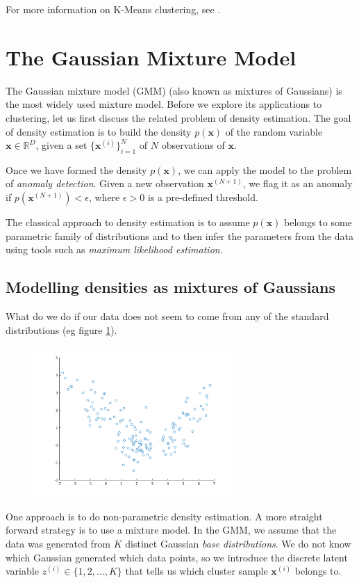 \documentclass[final,3p,times,twocolumn]{elsarticle}
\begin{document}
For more information on K-Means clustering, see \cite{Bishop}.

\section{The Gaussian Mixture Model}
The Gaussian mixture model (GMM) (also known as mixtures of Gaussians) is the most widely used mixture model.
Before we explore its applications to clustering, let us first discuss the related problem of density estimation.
The goal of density estimation is to build the density $p(\boldsymbol x)$ of the random variable $\boldsymbol x \in \mathbb{R}^D$, given a set $\{\boldsymbol x^{(i)}\}_{i=1}^N$ of $N$ observations of $\boldsymbol x$.

Once we have formed the density $p(\boldsymbol x)$, we can apply the model to the problem of \emph{anomaly detection}.
Given a new observation $\boldsymbol x^{(N+1)}$, we flag it as an anomaly if $p(\boldsymbol x^{(N+1)}) < \epsilon$, where $\epsilon > 0$ is a pre-defined threshold.

The classical approach to density estimation is to assume $p(\boldsymbol x)$ belongs to some parametric family of distributions and to then infer the parameters from the data using tools such as \emph{maximum likelihood estimation}. 

\subsection{Modelling densities as mixtures of Gaussians}

What do we do if our data does not seem to come from any of the standard distributions (eg figure \ref{fig:gmm1}).
\begin{figure}
\centering
\includegraphics[width=3in]{gmm1.png}
\label{fig:gmm1}
\end{figure}
One approach is to do non-parametric density estimation. A more straight forward strategy is to use a mixture model.
In the GMM, we assume that the data was generated from $K$ distinct Gaussian \emph{base distributions}. 
We do not know which Gaussian generated which data points, so we introduce the discrete latent variable $z^{(i)} \in \{1,2,\dots,K\}$ that tells us which cluster sample $\boldsymbol x^{(i)}$ belongs to.
\end{document}
